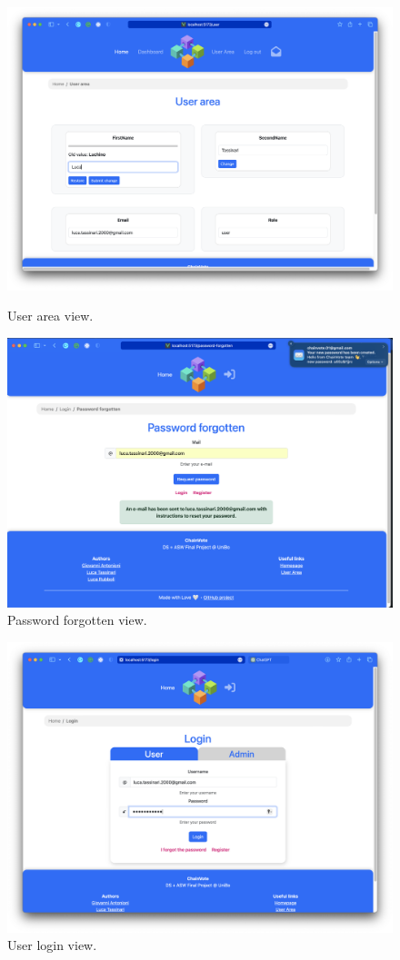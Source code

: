 \documentclass{scrartcl}
\begin{document}
\begin{figure}
    \centering
    \includegraphics[width=0.9\linewidth]{figures/story-board/7-user-area.png}
    \label{fig:user-area}
    \caption{User area view.}
\end{figure}

\begin{figure}
    \centering
    \includegraphics[width=0.8\linewidth]{figures/story-board/16-password-forgotten.png}
    \caption{Password forgotten view.}
    \label{fig:password-forgotten}
\end{figure}

\begin{figure}
    \centering
    \includegraphics[width=0.9\linewidth]{figures/story-board/5-user-login.png}
    \caption{User login view.}
    \label{fig:user-login}
\end{figure}
\end{document}
